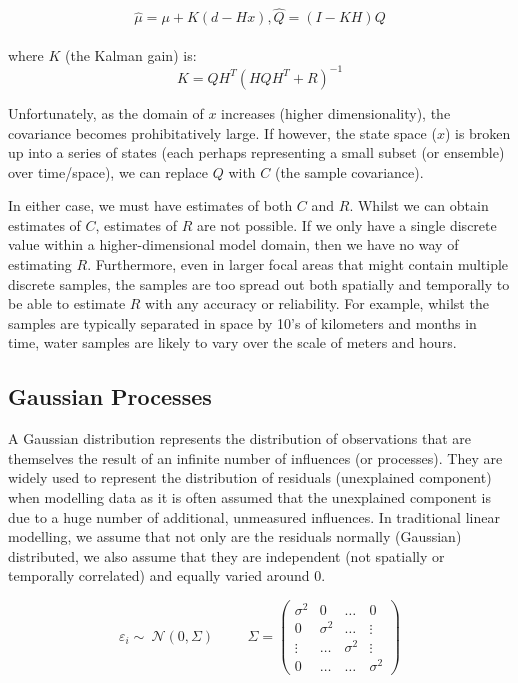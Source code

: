 $$\hat{\mu} = \mu + K(d - Hx), \hat{Q} = (I - KH)Q$$\\

where $K$ (the Kalman gain) is:\\

$$K = QH^T(HQH^T + R)^{-1}$$

Unfortunately, as the domain of $x$ increases (higher dimensionality), the
covariance becomes prohibitatively large.
If however, the state space ($x$) is broken up into a series of
states (each perhaps representing a small subset (or ensemble) over time/space),
we can replace $Q$ with $C$ (the sample covariance).

In either case, we must have estimates of both $C$ and $R$.  Whilst
we can obtain estimates of $C$, estimates of $R$ are not possible.  If
we only have a single discrete value within a higher-dimensional
model domain, then we have no way of estimating $R$.  Furthermore,
even in larger focal areas that might contain multiple discrete
samples, the samples are too spread out both spatially and
temporally to be able to estimate $R$ with any accuracy or
reliability.  For example, whilst the samples are typically
separated in space by 10's of kilometers and months in time, water
samples are likely to vary over the scale of meters and hours.


\subsection{Gaussian Processes}

A Gaussian distribution represents the distribution of observations that are themselves the result of an infinite number of influences (or processes).
They are widely used to represent the distribution of residuals (unexplained component) when modelling data as it is often assumed that the
unexplained component is due to a huge number of additional, unmeasured influences.  In traditional linear modelling, we assume that not only
are the residuals normally (Gaussian) distributed, we also assume that they are independent (not spatially or temporally correlated) and equally
varied around 0.

$$
\varepsilon_i \sim~\mathcal{N}(0, \Sigma)\hspace{1cm}
\Sigma = 
\begin{pmatrix}
\sigma^2 &   0      & \ldots   & 0\\
0        &\sigma^2  & \ldots   & \vdots\\
\vdots   & \ldots   &\sigma^2  & \vdots\\
0        & \ldots   &\ldots    &\sigma^2
\end{pmatrix}
$$

